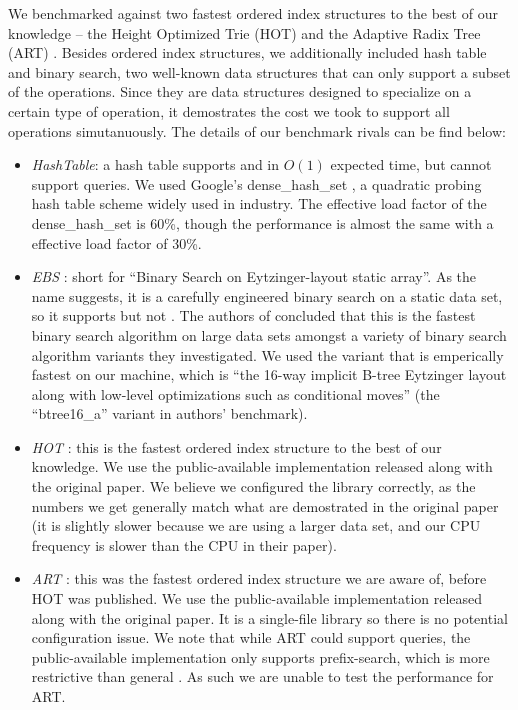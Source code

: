 \documentclass[11pt, usletter]{article}
\begin{document}
We benchmarked \MlpIndex against two fastest ordered index 
structures to the best of our knowledge -- the Height Optimized Trie (HOT) \cite{hot_sigmod18} and the Adaptive Radix Tree (ART) \cite{arttrie_icde13}.
Besides ordered index structures, we additionally included 
hash table and binary search, two well-known data structures that can only support a subset of the operations. 
Since they are data structures designed to specialize on a certain type of operation, 
it demostrates the cost we took to support all operations simutanuously. 
The details of our benchmark rivals can be find below:
\begin{itemize}
[topsep=0pt,partopsep=0pt,itemsep=0pt,parsep=0pt,fullwidth,itemindent=\parindent,listparindent=\parindent]
\item \textit{HashTable}: a hash table supports \insertion and \lookup in $O(1)$ expected time, but cannot support \lowerbound queries.
We used Google's dense\_hash\_set \cite{densehashset},
a quadratic probing hash table scheme widely used in industry.
The effective load factor of the dense\_hash\_set is 60\%, 
though the performance is almost the same with a effective load factor of 30\%.
\item \textit{EBS} \cite{binary_search_layout}: short for ``Binary Search on Eytzinger-layout static array''. 
As the name suggests, it is a carefully engineered binary search on a static data set, 
so it supports \lowerbound but not \insertion.
The authors of \cite{binary_search_layout} concluded that this is the fastest binary search algorithm on large data sets 
amongst a variety of binary search algorithm variants they investigated. 
We used the variant that is emperically fastest on our machine, which is ``the 16-way implicit B-tree Eytzinger layout
along with low-level optimizations such as conditional moves''
(the ``btree16\_a'' variant in authors' benchmark).
\item \textit{HOT} \cite{hot_sigmod18}: this is the fastest ordered index structure to the best of our knowledge. 
We use the public-available implementation released along with the original paper.
We believe we configured the library correctly,
as the numbers we get generally match what are demostrated in the original paper (it is slightly slower 
because we are using a larger data set, and our CPU frequency is slower than the CPU in their paper).
\item \textit{ART} \cite{arttrie_icde13}: this was the fastest ordered index structure we are aware of, before HOT was published.
We use the public-available implementation released along with the original paper.
It is a single-file library so there is no potential configuration issue.
We note that while ART could support \lowerbound queries, 
the public-available implementation only supports prefix-search, 
which is more restrictive than general \lowerbound. 
As such we are unable to test the \lowerbound performance for ART.
\end{itemize}
\end{document}
